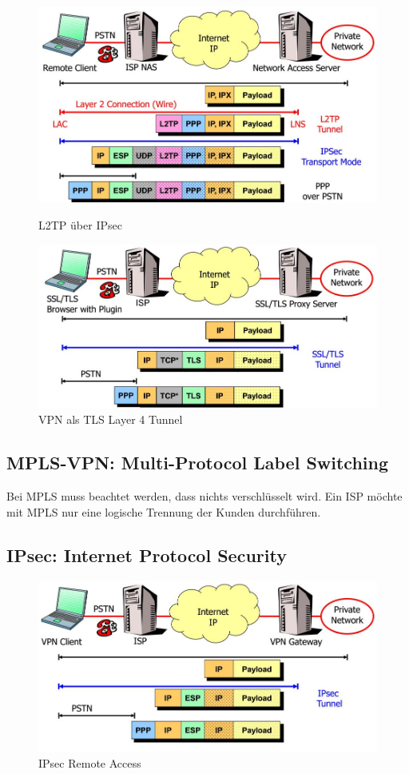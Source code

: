 \begin{figure}[ht!]
	\begin{minipage}[t]{0.4\textwidth}
		\centering
		\includegraphics[width=\linewidth]{images/l2tp_ipsec_remote_access}
		\caption{L2TP über IPsec}
		\label{fig:l2tpipsecremoteaccess}
	\end{minipage}
	\begin{minipage}[t]{0.4\textwidth}
		\centering
		\includegraphics[width=\linewidth]{images/l4_tls_tunnel}
		\caption{VPN als TLS Layer 4 Tunnel}
		\label{fig:l4tlstunnel}
	\end{minipage}
\end{figure}

\subsection{MPLS-VPN: Multi-Protocol Label Switching}
Bei MPLS muss beachtet werden, dass nichts verschlüsselt wird. Ein ISP möchte mit MPLS nur eine logische Trennung der Kunden durchführen.


\clearpage

\subsection{IPsec: Internet Protocol Security}\label{sec:ipsec-internet-protocol-security}
\begin{figure}[h]
\centering
\includegraphics[width=0.5\linewidth]{images/ipsec_remote_access}
\caption{IPsec Remote Access}
\label{fig:ipsecremoteaccess}
\end{figure}

